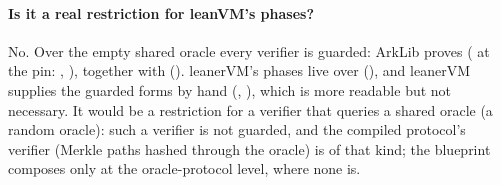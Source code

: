 \paragraph{Is it a real restriction for leanVM's phases?} No. Over the empty shared oracle every
verifier is guarded: ArkLib proves \allowbreak{}\allowbreak{}
(\allowbreak{}\allowbreak{} at the pin:
\allowbreak{}\allowbreak{}\allowbreak{}\allowbreak{}, \allowbreak{}),
together with \allowbreak{} (). leanerVM's phases live over
 (\allowbreak{}\allowbreak{}), and leanerVM supplies the guarded
forms by hand (, \allowbreak{}), which is more
readable but not necessary. It would be a restriction for a verifier that queries a shared oracle
(a random oracle): such a verifier is not guarded, and the compiled protocol's verifier (Merkle
paths hashed through the oracle) is of that kind; the blueprint composes only at the
oracle-protocol level, where none is.

